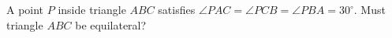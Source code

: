 A point $P$ inside triangle $ABC$ satisfies $\angle PAC=\angle PCB=\angle PBA=30^\circ$. Must triangle $ABC$ be equilateral?
